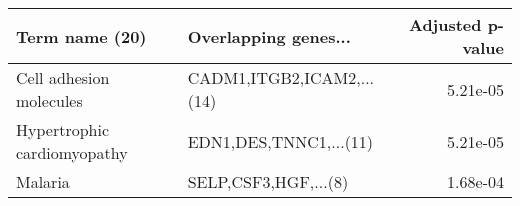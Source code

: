 \begin{tabular}{llr}
\toprule
             Term name (20) &      Overlapping genes... &  Adjusted p-value \\
\midrule
    Cell adhesion molecules & CADM1,ITGB2,ICAM2,...(14) &          5.21e-05 \\
Hypertrophic cardiomyopathy &    EDN1,DES,TNNC1,...(11) &          5.21e-05 \\
                    Malaria &      SELP,CSF3,HGF,...(8) &          1.68e-04 \\
\bottomrule
\end{tabular}
